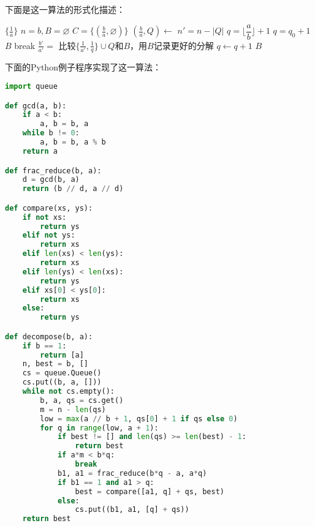 下面是这一算法的形式化描述：

\begin{algorithmic}[1]
    \State \Return $\{\frac{1}{a}\}$
  \EndIf
  \State $n = b, B = \varnothing$
  \State $C = \{(\frac{b}{a}, \varnothing)\}$
    \State $(\frac{b}{a}, Q) \gets $   
    \State $n' = n - |Q|$                            
    \State $q = \lfloor \dfrac{a}{b} \rfloor + 1$
      
      \State $q = q_0 + 1$
    \EndIf
       
        \State \Return $B$
      \EndIf
       
        \State break
      \EndIf
      \State $\frac{b'}{a'} = $  
        \State 比较$\{\frac{1}{a'}, \frac{1}{q}\} \cup Q$和$B$，用$B$记录更好的分解
      \Else
        \State {} 
      \EndIf
      \State $q \gets q + 1$
    \EndWhile
  \EndWhile
  \State \Return $B$
\EndFunction
\end{algorithmic}

下面的Python例子程序实现了这一算法：
\begin{lstlisting}[language = Python, frame = single]
import queue

def gcd(a, b):
    if a < b:
        a, b = b, a
    while b != 0:
        a, b = b, a % b
    return a

def frac_reduce(b, a):
    d = gcd(b, a)
    return (b // d, a // d)

def compare(xs, ys):
    if not xs:
        return ys
    elif not ys:
        return xs
    elif len(xs) < len(ys):
        return xs
    elif len(ys) < len(xs):
        return ys
    elif xs[0] < ys[0]:
        return xs
    else:
        return ys

def decompose(b, a):
    if b == 1:
        return [a]
    n, best = b, []
    cs = queue.Queue()
    cs.put((b, a, []))
    while not cs.empty():
        b, a, qs = cs.get()
        m = n - len(qs)
        low = max(a // b + 1, qs[0] + 1 if qs else 0)
        for q in range(low, a + 1):
            if best != [] and len(qs) >= len(best) - 1:
                return best
            if a*m < b*q:
                break
            b1, a1 = frac_reduce(b*q - a, a*q)
            if b1 == 1 and a1 > q:
                best = compare([a1, q] + qs, best)
            else:
                cs.put((b1, a1, [q] + qs))
    return best
\end{lstlisting}
